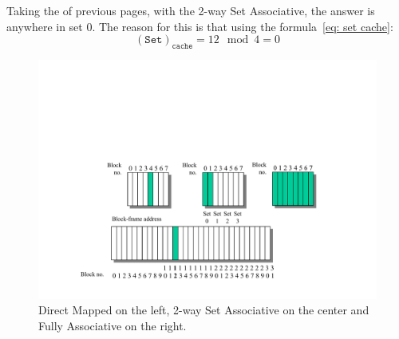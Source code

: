 \newpage

\noindent
Taking the  of previous pages, with the 2-way Set Associative, the answer is anywhere in set $0$. The reason for this is that using the formula~\ref{eq: set cache}:
\begin{equation*}
    \left(\texttt{Set}\right)_{\texttt{cache}} = 12 \mod 4 = 0
\end{equation*}

\begin{figure}[!htp]
    \centering
    \includegraphics[width=\textwidth]{img/n-way-set-associative-cache-2.pdf}
    \caption*{Direct Mapped on the left, 2-way Set Associative on the center and Fully Associative on the right.}
\end{figure}